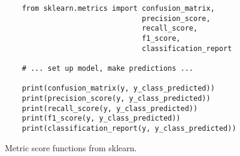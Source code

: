 \begin{figure}[h]
\begin{code}
  \begin{verbatim}
    from sklearn.metrics import confusion_matrix, 
                                precision_score, 
                                recall_score, 
                                f1_score, 
                                classification_report

    # ... set up model, make predictions ...

    print(confusion_matrix(y, y_class_predicted))
    print(precision_score(y, y_class_predicted))
    print(recall_score(y, y_class_predicted))
    print(f1_score(y, y_class_predicted))
    print(classification_report(y, y_class_predicted))
  \end{verbatim}
  \caption{Metric score functions from sklearn.}
  \label{code:sklearn_metrics}
\end{code}
\end{figure}